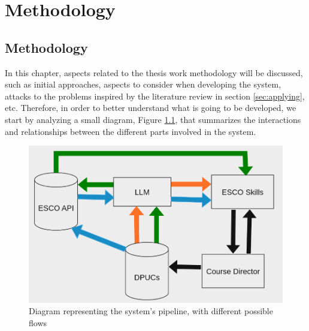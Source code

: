 \chapter{Methodology}
\label{chapter:methodology}

\section{Methodology}
In this chapter, aspects related to the thesis work methodology will be discussed, such as initial approaches, aspects to consider when developing the system, attacks to the problems inspired by the literature review in section \ref{sec:applying}, etc.
Therefore, in order to better understand what is going to be developed, we start by analyzing a small diagram, Figure \ref{fig:diagrama}, that summarizes the interactions and relationships between the different parts involved in the system.

\begin{figure}[H]
   \centering
   \includegraphics[width=15cm]{figs/diagrama.png}
   \caption{Diagram representing the system's pipeline, with different possible flows}
   \label{fig:diagrama}
\end{figure}


